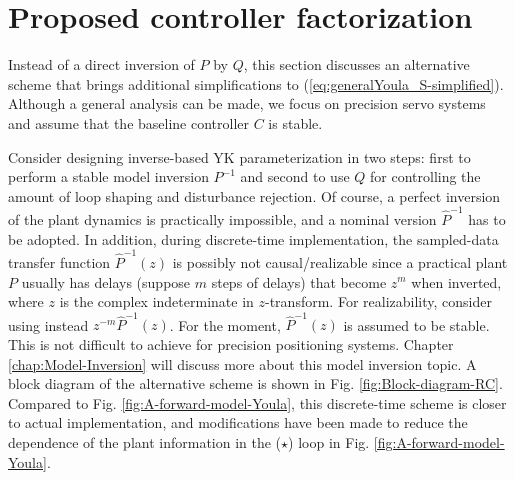 \documentclass [11pt, proquest] {uwthesis}[2020/02/24]
\begin{document}
\section{Proposed controller factorization} \label{sec:Proposed0-controller-factorization}

\label{sec:Instead-of-a}Instead of a direct inversion of $P$ by
$Q$, this section discusses an alternative scheme that brings additional
simplifications to (\ref{eq:generalYoula_S-simplified}). Although
a general analysis can be made, we focus on precision servo systems
and assume that the baseline controller $C$ is stable. 

Consider designing inverse-based YK parameterization in two steps:
first to perform a stable model inversion $P^{-1}$ and second to
use $Q$ for controlling the amount of loop shaping and disturbance
rejection. Of course, a perfect inversion of the plant dynamics is
practically impossible, and a nominal version $\hat{P}^{-1}$ has
to be adopted. In addition, during discrete-time implementation, the
sampled-data transfer function $\hat{P}^{-1}(z)$ is possibly not
causal/realizable since a practical plant $P$ usually has delays
(suppose $m$ steps of delays) that become $z^{m}$ when inverted, where $z$ is the complex indeterminate in $z$-transform.
For realizability, consider using instead $z^{-m}\hat{P}^{-1}(z)$.
For the moment, $\hat{P}^{-1}(z)$ is assumed to be stable. This is
not difficult to achieve for precision positioning systems. Chapter \ref{chap:Model-Inversion} will discuss more about this model inversion topic. A block
diagram of the alternative scheme is shown in Fig. \ref{fig:Block-diagram-RC}.
Compared to Fig. \ref{fig:A-forward-model-Youla}, this discrete-time
scheme is closer to actual implementation, and modifications have
been made to reduce the dependence of the plant information in the
($\star$) loop in Fig. \ref{fig:A-forward-model-Youla}. 
\end{document}
